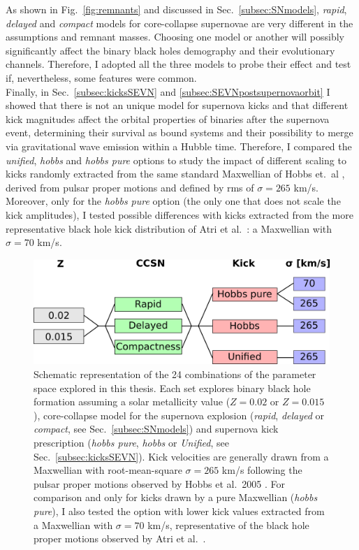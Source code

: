 \documentclass[a4paper,titlepage]{book}     	%
\begin{document}
As shown in Fig.\ \ref{fig:remnants} and discussed in Sec.\ \ref{subsec:SNmodels}, \emph{rapid}, \emph{delayed} and \emph{compact} models for core-collapse supernovae are very different in the assumptions and remnant masses. Choosing one model or another will possibly significantly affect the binary black holes demography and their evolutionary channels. Therefore, I adopted all the three models to probe their effect and test if, nevertheless, some features were common.\\

Finally, in Sec.\ \ref{subsec:kicksSEVN} and \ref{subsec:SEVNpostsupernovaorbit} I showed that there is not an unique model for supernova kicks and that different kick magnitudes affect the orbital properties of binaries after the supernova event, determining their survival as bound systems and their possibility to merge via gravitational wave emission within a Hubble time. Therefore, I compared the \emph{unified}, \emph{hobbs} and \emph{hobbs pure} options to study the impact of different scaling to kicks randomly extracted from the same standard Maxwellian of Hobbs et.\ al \cite{Hobbs2005}, derived from pulsar proper motions and defined by rms of $\sigma=265$ km/s. Moreover, only for the \emph{hobbs pure} option (the only one that does not scale the kick amplitudes), I tested possible differences with kicks extracted from the more representative black hole kick distribution of Atri et al.\ \cite{Atri2019_kicks}: a Maxwellian with $\sigma=70$ km/s.



\begin{figure}
	\centering
	\includegraphics[width=.95\textwidth]{./images/parameterspace.png}	
	\caption{Schematic representation of the 24 combinations of the parameter space explored in this thesis. Each set explores binary black hole formation assuming a solar metallicity value ($Z=0.02$ or $Z=0.015$), core-collapse model for the supernova explosion (\emph{rapid}, \emph{delayed} or \emph{compact}, see Sec.\ \ref{subsec:SNmodels}) and supernova kick prescription (\emph{hobbs pure}, \emph{hobbs} or \emph{Unified}, see Sec.\ \ref{subsec:kicksSEVN}). Kick velocities are generally drawn from a Maxwellian with root-mean-square $\sigma = 265$ km/s following the pulsar proper motions observed by Hobbs et al.\ 2005 \cite{Hobbs2005}. For comparison and only for kicks drawn by a pure Maxwellian (\emph{hobbs pure}), I also tested the option with lower kick values extracted from a Maxwellian with $\sigma = 70$ km/s,  representative of the black hole proper motions observed by Atri et al.\ \cite{Atri2019_kicks}.}\label{fig:parameterspace}
\end{figure}
\end{document}
